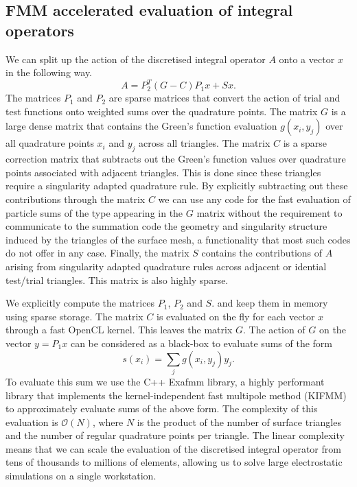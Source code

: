 \subsection{FMM accelerated evaluation of integral operators}
We can split up the action of the discretised integral operator $A$ onto a vector $x$ in the following way.
$$
A = P_2^T (G - C)P_1x + Sx.
$$
The matrices $P_1$ and $P_2$ are sparse matrices that convert the action of trial and test functions onto weighted sums over the quadrature points. The matrix $G$ is a large dense matrix that contains the Green's function evaluation $g(x_i, y_j)$ over all quadrature points $x_i$ and $y_j$ across all triangles. The matrix $C$ is a sparse correction matrix that subtracts out the Green's function values over quadrature points associated with  adjacent triangles. This is done since these triangles require a singularity adapted quadrature rule. By explicitly subtracting out these contributions through the matrix $C$ we can use any code for the fast evaluation of particle sums of the type appearing in the $G$ matrix without the requirement to communicate to the summation code the geometry and singularity structure induced by the triangles of the surface mesh, a functionality that most such codes do not offer in any case. Finally, the matrix $S$ contains the contributions of $A$ arising from singularity adapted quadrature rules across adjacent or idential test/trial triangles. This matrix is also highly sparse.

We explicitly compute the matrices $P_1$, $P_2$ and $S$. and keep them in memory using sparse storage. The matrix $C$ is evaluated on the fly for each vector $x$ through a fast OpenCL kernel. This leaves the matrix $G$. The action of $G$ on the vector $y=P_1x$ can be considered as a black-box to evaluate sums of the form
$$
s(x_i) = \sum_jg(x_i, y_j)y_j.
$$
To evaluate this sum we use the C++ Exafmm library, a highly performant library that implements the kernel-independent fast multipole method (KIFMM) to approximately evaluate sums of the above form. The complexity of this evaluation is $\mathcal{O}(N)$, where $N$ is the product of the number of surface triangles and the number of regular quadrature points per triangle. The linear complexity means that we can scale the evaluation of the discretised integral operator from tens of thousands to millions of elements, allowing us to solve large  electrostatic simulations on a single workstation.